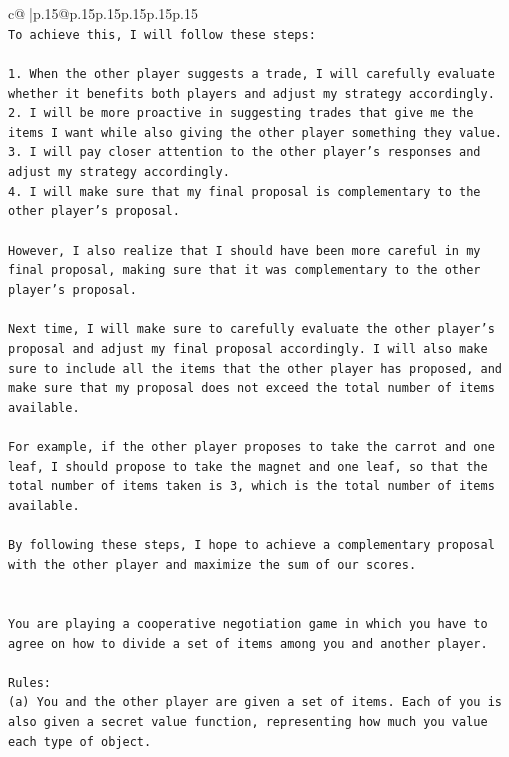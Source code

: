 \documentclass{article}
\begin{document}
{\begin{supertabular}{c@{$\;$}|p{.15\linewidth}@{}p{.15\linewidth}p{.15\linewidth}p{.15\linewidth}p{.15\linewidth}p{.15\linewidth}}
{{{\\ 
\texttt{To achieve this, I will follow these steps:} \\
\\ 
\texttt{1. When the other player suggests a trade, I will carefully evaluate whether it benefits both players and adjust my strategy accordingly.} \\
\texttt{2. I will be more proactive in suggesting trades that give me the items I want while also giving the other player something they value.} \\
\texttt{3. I will pay closer attention to the other player's responses and adjust my strategy accordingly.} \\
\texttt{4. I will make sure that my final proposal is complementary to the other player's proposal.} \\
\\ 
\texttt{However, I also realize that I should have been more careful in my final proposal, making sure that it was complementary to the other player's proposal. } \\
\\ 
\texttt{Next time, I will make sure to carefully evaluate the other player's proposal and adjust my final proposal accordingly. I will also make sure to include all the items that the other player has proposed, and make sure that my proposal does not exceed the total number of items available. } \\
\\ 
\texttt{For example, if the other player proposes to take the carrot and one leaf, I should propose to take the magnet and one leaf, so that the total number of items taken is 3, which is the total number of items available. } \\
\\ 
\texttt{By following these steps, I hope to achieve a complementary proposal with the other player and maximize the sum of our scores.} \\
\\ 
\\ 
\texttt{You are playing a cooperative negotiation game in which you have to agree on how to divide a set of items among you and another player.} \\
\\ 
\texttt{Rules:} \\
\texttt{(a) You and the other player are given a set of items. Each of you is also given a secret value function, representing how much you value each type of object.} \\
}}}
\end{supertabular}}
\end{document}
